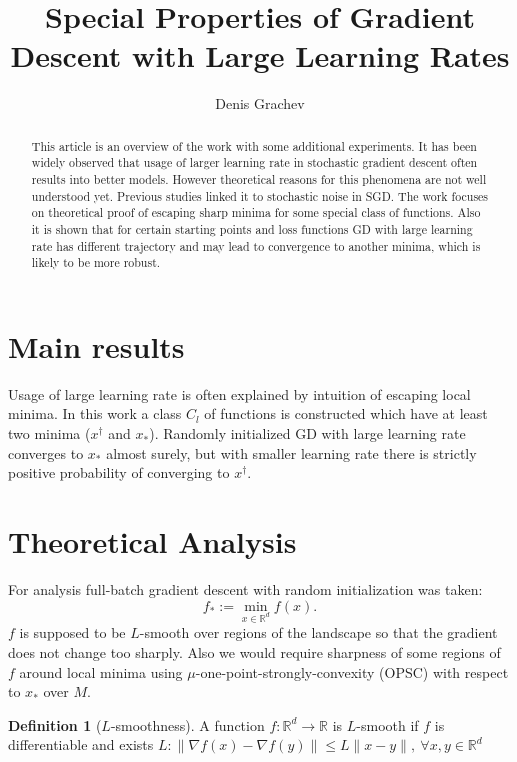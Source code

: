 \documentclass{article}
\title{Special Properties of Gradient Descent with Large Learning Rates}
\author{Denis Grachev}
\theoremstyle{definition}
\newtheorem{definition}{Definition}[section]
\begin{document}
\maketitle

\begin{abstract}
This article is an overview of the work \cite{mohtashami2023special}
with some additional experiments. 
It has been widely observed that usage of larger learning 
rate in stochastic gradient descent often results into better models.
However theoretical reasons for this phenomena are not well understood yet.
Previous studies linked it to stochastic noise in SGD. 
The work focuses on theoretical proof of escaping sharp minima 
for some special class of functions. 
Also it is shown that for certain starting points and loss functions
GD with large learning rate has different trajectory 
and may lead to convergence to another minima, 
which is likely to be more robust. 

\end{abstract}


\section{Main results}
Usage of large learning rate is often explained by intuition of 
escaping local minima. 
In this work a class $C_l$ of functions is constructed 
which have at least two minima ($x^\dagger$ and $x_\ast$). 
Randomly initialized GD with large learning rate converges 
to $x_\ast$ almost surely, but with smaller learning rate 
there is strictly positive probability of converging to $x^\dagger$.

\section{Theoretical Analysis}
For analysis full-batch gradient descent with random initialization was taken:
$$ f_* := \min_{x \in \mathbb{R}^d} f(x).$$
$f$ is supposed to be $L$-smooth over regions of the landscape 
so that the gradient does not change too sharply. 
Also we would require sharpness of some regions of $f$ 
around local minima using 
$\mu$-one-point-strongly-convexity (OPSC) with respect to $x_\ast$ over $M$.

\begin{definition}[$L$-smoothness]
    A function $f: \mathbb{R}^d \rightarrow \mathbb{R}$ 
    is $L$-smooth if $f$ is differentiable and 
    exists $L: \| \nabla f(x) - \nabla f(y)\| \leq L \| x - y \|, \: \forall x, y \in \mathbb{R}^d$ 
\end{definition}
\end{document}
